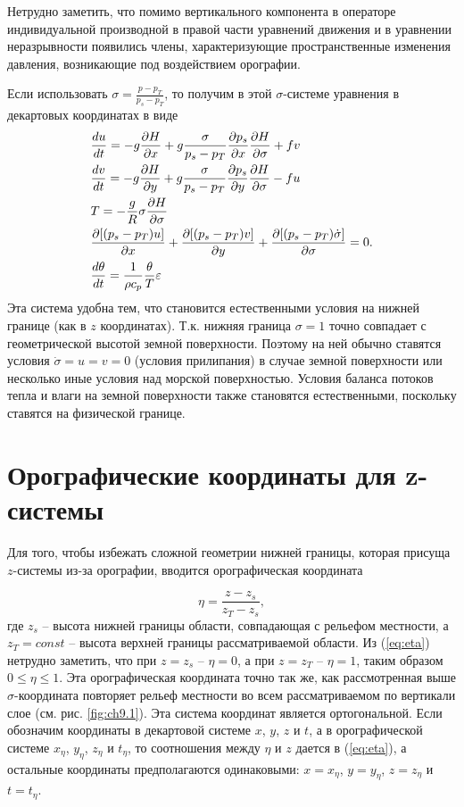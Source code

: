 Нетрудно заметить, что помимо вертикального компонента в операторе индивидуальной производной в правой части уравнений движения и в уравнении неразрывности появились члены, характеризующие пространственные изменения давления, возникающие под воздействием орографии.  

Если использовать $\sigma=\frac{p-p_T}{p_s-p_T}$, то получим в этой $\sigma$-системе уравнения в декартовых координатах в виде
\begin{align}
    \label{eq:dudt2nabla}
    &\displaystyle\frac{d u}{d t} = -g\displaystyle\frac{\partial H}{\partial x}+g\frac{\sigma}{p_s-p_T}\displaystyle\frac{\partial p_s}{\partial x}\displaystyle\frac{\partial H}{\partial \sigma}+fv \\
    \label{eq:dvdt2nabla}
    &\displaystyle\frac{d v}{d t} = -g\displaystyle\frac{\partial H}{\partial y}+g\frac{\sigma}{p_s-p_T}\displaystyle\frac{\partial p_s}{\partial y}\displaystyle\frac{\partial H}{\partial \sigma}-fu \\
    \label{eq:hydrostat2nabla}
    &T=-\frac{g}{R}\sigma\displaystyle\frac{\partial H}{\partial \sigma} \\
    \label{eq:consm2nabla}
    &\displaystyle\frac{\partial [(p_s-p_T)u]}{\partial x} + \displaystyle\frac{\partial [(p_s-p_T)v]}{\partial y} + \displaystyle\frac{\partial [(p_s-p_T)\dot{\sigma}]}{\partial \sigma} = 0. \\
    \label{eq:temp2nabla}
    &\displaystyle\frac{d \theta}{d t}=\frac{1}{\rho c_p}\frac{\theta}{T}\varepsilon 
\end{align}
Эта система удобна тем, что становится естественными условия на нижней границе (как в $z$ координатах). Т.к. нижняя граница $\sigma=1$ точно совпадает с геометрической высотой земной поверхности. Поэтому на ней обычно ставятся условия $\dot{\sigma}=u=v=0$ (условия прилипания) в случае земной поверхности или несколько иные условия над морской поверхностью. Условия баланса потоков тепла и влаги на земной поверхности также становятся естественными, поскольку ставятся на физической границе. 

\section{{\color{done}Орографические координаты для z-системы}}
Для того, чтобы избежать сложной геометрии нижней границы, которая присуща $z$-системы из-за орографии, вводится орографическая координата

\begin{equation}
    \label{eq:eta}
    \eta=\frac{z-z_s}{z_T-z_s}, 
\end{equation}
где $z_s$ -- высота нижней границы области, совпадающая с рельефом местности, а $z_T=const$ -- высота верхней границы рассматриваемой области. Из (\ref{eq:eta}) нетрудно заметить, что при $z=z_s$ -- $\eta=0$, а при $z=z_T$ -- $\eta=1$, таким образом $0\leq\eta\leq1$. Эта орографическая координата точно так же, как рассмотренная выше $\sigma$-координата повторяет рельеф местности во всем рассматриваемом по вертикали слое (см. рис. \ref{fig:ch9.1}). Эта система координат является ортогональной. Если обозначим координаты в декартовой системе $x$, $y$, $z$ и $t$, а в орографической системе $x_{\eta}$, $y_{\eta}$, $z_{\eta}$ и $t_{\eta}$, то соотношения между $\eta$ и $z$ дается в (\ref{eq:eta}), а остальные координаты предполагаются одинаковыми: $x=x_{\eta}$, $y=y_{\eta}$, $z=z_{\eta}$ и $t=t_{\eta}$. 

